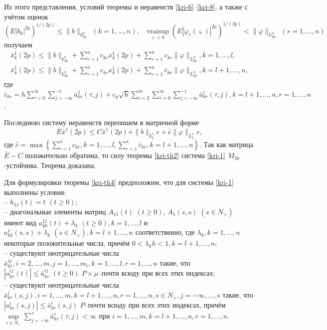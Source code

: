 Из этого представления, условий теоремы и неравенств \eqref{kri-6}--\eqref{kri-8},  а
также с учётом оценок 
$$
(E|b_k|^{2p})^{1/(2p)} \leq \|b\|_{k^n_{2p}}
\ \ (k=1,\dots,n), \ \ \ \mathrel {\mathop {v r a i \sup} \limits
_{\varsigma < 0}}(E|\varphi _r(\varsigma )|^{2p})^{1/(2p)} <
\|\varphi  \|_{L_{2p}^n} \ \ (r=1,\dots,n)
$$ получаем
$$
\begin{array}{crl}
\bar x^1_k(2p) \leq \|b\|_{k^n_{2p}} + \sum \limits
_{r=1}^{n}c_{kr}x^1_k(2p) +
\sum \limits_{r=1}^{n}c_{kr} \|\varphi \|_{L_{2p}^n}, k = 1, \dots ,l,\\
\bar x^1_k(2p) \leq \|b\|_{k^n_{2p}} + \sum
\limits_{r=1}^{n}c_{kr}x^1_k(2p) + \sum \limits_{r=1}^{n}\bar
c_{kr}\|\varphi  \|_{L_{2p}^n}, k = l + 1, \dots ,n,
\end{array}
$$
где $\bar c_{kr} = h\sum \limits _{\tau=0 }^{\infty }\sum \limits
_{j=-\infty }^{-1}\bar a^{1}_{kr}(\tau,j) + c_p \sqrt{h}\sum \limits
_{i=2}^{m}\sum \limits _{\tau=0 }^{\infty }\sum \limits _{j=-\infty
}^{-1} \bar a^{i}_{kr}(\tau,j), k = l+1, \dots,n, r = 1, \dots, n$.

Последнюю систему неравенств перепишем в матричной форме
$$
\bar E\bar x^1 (2p) \leq C\bar x^1 (2p) + \|b\|_{k^n_{q}}e +
\hat c \|\varphi \|_{L^n_q} e,
$$
где $\hat c = \max \left\{ \sum \limits_{r=1}^{n}c_{kr}, k = 1, \dots
,l, \sum \limits_{r=1}^{n}\bar c_{kr}, k = l + 1, \dots ,n \right\}$.
Так как матрица  $\bar E - C$ положительно обратима, то силу теоремы
\ref{kri-th2} система \eqref{kri-1} $M_{2p}$-устойчива. Теорема доказана.

Для формулировки теоремы \ref{kri-th4} предположим, что для системы \eqref{kri-1}
выполнены условия:\\
\noindent
  -- $h_{11}(t) = t \,\,
(t \geq 0)$;\\
  -- диагональные элементы матриц $A_{11}(t)\,\, (t \geq
0)$, $A_1(s,s) \,\, (s \in N_+)$ имеют вид $a_{kk}^{11}(t) + \lambda
_k \,\, (t \geq 0), k=1, \dots, l$ и $a_{kk}^{1}(s,s) + \lambda _k
\,\, (s \in N_+), k=l + 1, \dots, n$ соответственно, где $\lambda _k,
k = 1, \dots, n$ некоторые положительные числа, причём $0 < \lambda
_kh < 1, k = l + 1, \dots, n$;\\
  -- существуют  неотрицательные числа  $\bar
a^{ij}_{kr}, i = 2,\dots,m, j = 1,\dots,m_i, k =1,\dots,l, r = 1,\dots,n$
 такие, что $|a^{ij}_{kr}(t)|\leq \bar
a^{ij}_{kr} \,\, (t\geq 0) $ $P\times\mu$--почти всюду при всех этих
индексах;\\
  -- существуют  неотрицательные числа
$\bar a^i_{kr}(s,j),i=1,\dots,m, k = l+1, \dots, n, r = 1,\dots,n, s\in
N_+, j=-\infty,\dots,s$ такие, что  $|a^i_{kr}(s,j)| \leq \bar
a^i_{kr}(s,j)$ $P$--почти всюду при всех этих индексах, причём $
\mathrel {\mathop {\sup} \limits _{\tau \in N_+ }} \sum \limits
_{j=-\infty }^{\tau}\bar a^{i}_{kr}(\tau,j) < \infty$ при
$i=1,\dots,m, k = l+1, \dots, n, r = 1,\dots,n$.

